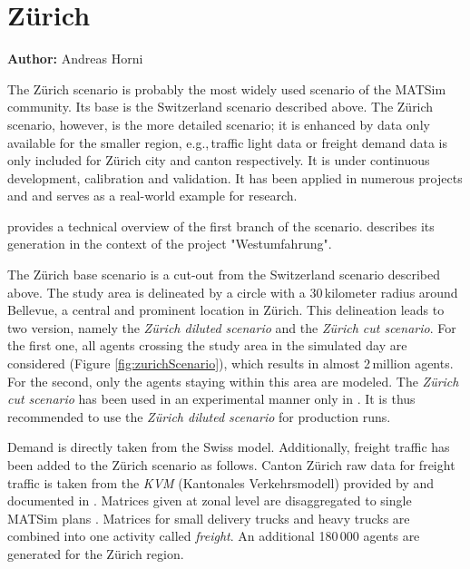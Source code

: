 \section{Zürich}
\label{sec:zhscenario}
\hfill \textbf{Author:} Andreas Horni

The Zürich scenario is probably the most widely used scenario of the MATSim community. Its base is the Switzerland scenario described above. The Zürich scenario, however, is the more detailed scenario; it is enhanced by data only available for the smaller region, e.g.,\,traffic light data or freight demand data is only included for Zürich city and canton respectively. It is under continuous development, calibration and validation. It has been applied in numerous projects and and serves as a real-world example for research.   

\citet{HorniEtAl_TechRep_IVT_2011_a} provides a technical overview of the first branch of the scenario. \citet[][]{BalmerEtAl_ResRep_bdktzrh_2009} describes its generation in the context of the project "Westumfahrung". 

The Zürich base scenario is a cut-out from the Switzerland scenario described above. The study area is delineated by a circle with a 30\,kilometer radius around Bellevue, a central and prominent location in Zürich. This delineation leads to two version, namely the \emph{Zürich diluted scenario} and the \emph{Zürich cut scenario}. For the first one, all agents crossing the study area in the simulated day are considered (Figure \ref{fig:zurichScenario}), which results in almost 2\,million agents. For the second, only the agents staying within this area are modeled. The \emph{Zürich cut scenario} has been used in an experimental manner only in \citet[][]{Hackney_PhDThesis_2009}. It is thus recommended to use the \emph{Zürich diluted scenario} for production runs.

Demand is directly taken from the Swiss model. Additionally, freight traffic has been added to the Zürich scenario as follows. Canton Zürich raw data for freight traffic is taken from the \emph{KVM} (Kantonales Verkehrsmodell) provided by \citet{AMV_Webpage_2011} and documented in \citet[][]{GottardiBuergler_SV_1999}. Matrices given at zonal level are disaggregated to single MATSim plans \citep[][]{ShahM_TechRep_IVT_2010}. Matrices for small delivery trucks and heavy trucks are combined into one activity called \emph{freight}. An additional 180\,000 agents are generated for the Zürich region.

